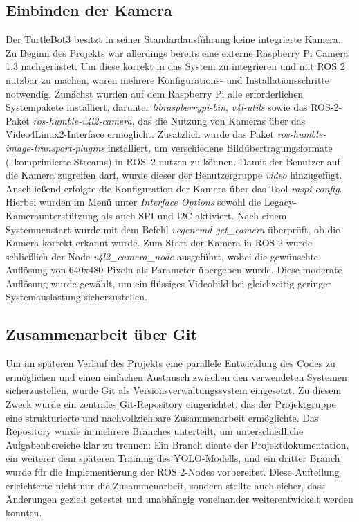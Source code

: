 \subsection{Einbinden der Kamera}
Der TurtleBot3 besitzt in seiner Standardausführung keine integrierte Kamera. 
Zu Beginn des Projekts war allerdings bereits eine externe Raspberry Pi Camera 1.3 nachgerüstet. 
Um diese korrekt in das System zu integrieren und mit ROS 2 nutzbar zu machen, waren mehrere Konfigurations- und Installationsschritte notwendig.
\newPar
Zunächst wurden auf dem Raspberry Pi alle erforderlichen Systempakete installiert, darunter \textit{libraspberrypi-bin}, \textit{v4l-utils} sowie das ROS-2-Paket \textit{ros-humble-v4l2-camera}, das die Nutzung von Kameras über das Video4Linux2-Interface ermöglicht. 
Zusätzlich wurde das Paket \textit{ros-humble-image-transport-plugins} installiert, um verschiedene Bildübertragungsformate (\zB~komprimierte Streams) in ROS~2 nutzen zu können. 
Damit der Benutzer auf die Kamera zugreifen darf, wurde dieser der Benutzergruppe \textit{video} hinzugefügt.
\newPar
Anschließend erfolgte die Konfiguration der Kamera über das Tool \textit{raspi-config}. 
Hierbei wurden im Menü unter \textit{Interface Options} sowohl die Legacy\hyp{}Kameraunterstützung als auch SPI und I2C aktiviert. 
Nach einem Systemneustart wurde mit dem Befehl \textit{vcgencmd get\_camera} überprüft, ob die Kamera korrekt erkannt wurde.
\newPar
Zum Start der Kamera in ROS 2 wurde schließlich der Node \textit{v4l2\_camera\_node} ausgeführt, wobei die gewünschte Auflösung von 640x480 Pixeln als Parameter übergeben wurde. 
Diese moderate Auflösung wurde gewählt, um ein flüssiges Videobild bei gleichzeitig geringer Systemauslastung sicherzustellen.
\subsection{Zusammenarbeit über Git}
Um im späteren Verlauf des Projekts eine parallele Entwicklung des Codes zu ermöglichen und einen einfachen Austausch zwischen den verwendeten Systemen sicherzustellen, wurde Git als Versionsverwaltungssystem eingesetzt. 
Zu diesem Zweck wurde ein zentrales Git-Repository eingerichtet, das der Projektgruppe eine strukturierte und nachvollziehbare Zusammenarbeit ermöglichte.
\newPar
Das Repository wurde in mehrere Branches unterteilt, um unterschiedliche Aufgabenbereiche klar zu trennen: 
Ein Branch diente der Projektdokumentation, ein weiterer dem späteren Training des YOLO-Modells, und ein dritter Branch wurde für die Implementierung der ROS 2-Nodes vorbereitet. 
Diese Aufteilung erleichterte nicht nur die Zusammenarbeit, sondern stellte auch sicher, dass Änderungen gezielt getestet und unabhängig voneinander weiterentwickelt werden konnten.